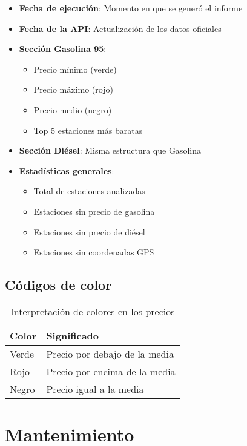 \begin{itemize}
  \item \textbf{Fecha de ejecución}: Momento en que se generó el informe
  \item \textbf{Fecha de la API}: Actualización de los datos oficiales
  \item \textbf{Sección Gasolina 95}:
        \begin{itemize}
          \item Precio mínimo (verde)
          \item Precio máximo (rojo)
          \item Precio medio (negro)
          \item Top 5 estaciones más baratas
        \end{itemize}
  \item \textbf{Sección Diésel}: Misma estructura que Gasolina
  \item \textbf{Estadísticas generales}:
        \begin{itemize}
          \item Total de estaciones analizadas
          \item Estaciones sin precio de gasolina
          \item Estaciones sin precio de diésel
          \item Estaciones sin coordenadas GPS
        \end{itemize}
\end{itemize}

\subsection{Códigos de color}

\begin{table}[H]
  \centering
  \begin{tabular}{@{}ll@{}}
    \toprule
    \textbf{Color} & \textbf{Significado}          \\ \midrule
    Verde          & Precio por debajo de la media \\
    Rojo           & Precio por encima de la media \\
    Negro          & Precio igual a la media       \\ \bottomrule
  \end{tabular}
  \caption{Interpretación de colores en los precios}
\end{table}

\section{Mantenimiento}

